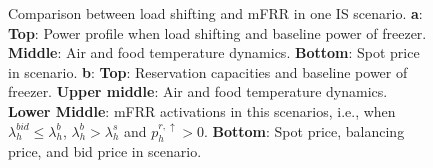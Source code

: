 \begin{figure}[!t]
    \caption{Comparison between load shifting and mFRR in one IS scenario. \textbf{a}: \textbf{Top}: Power profile when load shifting and baseline power of freezer. \textbf{Middle}: Air and food temperature dynamics. \textbf{Bottom}: Spot price in scenario. \textbf{b}: \textbf{Top}: Reservation capacities and baseline power of freezer. \textbf{Upper middle}: Air and food temperature dynamics. \textbf{Lower Middle}: mFRR activations in this scenarios, i.e., when $\lambda_{h}^{bid} \leq \lambda_{h}^{b}$, $\lambda_{h}^{b} > \lambda_{h}^{s}$ and $p^{r,\uparrow}_{h} > 0$. \textbf{Bottom}: Spot price, balancing price, and bid price in scenario.}
    \label{fig:fig_sim}
\end{figure}

